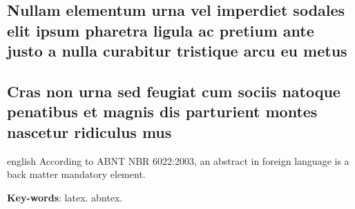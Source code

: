 \documentclass[article,11pt,oneside,a4paper,english]{abntex2}
\begin{document}

\begin{apendicesenv}

\chapter{Nullam elementum urna vel imperdiet sodales elit ipsum pharetra ligula
ac pretium ante justo a nulla curabitur tristique arcu eu metus}
\lipsum[55-57]

\end{apendicesenv}

\begin{anexosenv}

\chapter{Cras non urna sed feugiat cum sociis natoque penatibus et magnis dis
parturient montes nascetur ridiculus mus}

\lipsum[31]

\end{anexosenv}




\emptythanks
\maketitle

\renewcommand{\resumoname}{Abstract}
\begin{resumoumacoluna}
 \begin{otherlanguage*}{english}
   According to ABNT NBR 6022:2003, an abstract in foreign language is a back
   matter mandatory element.

   \vspace{\onelineskip}
 
   \noindent
   \textbf{Key-words}: latex. abntex.
 \end{otherlanguage*}  
\end{resumoumacoluna}

\end{document}
